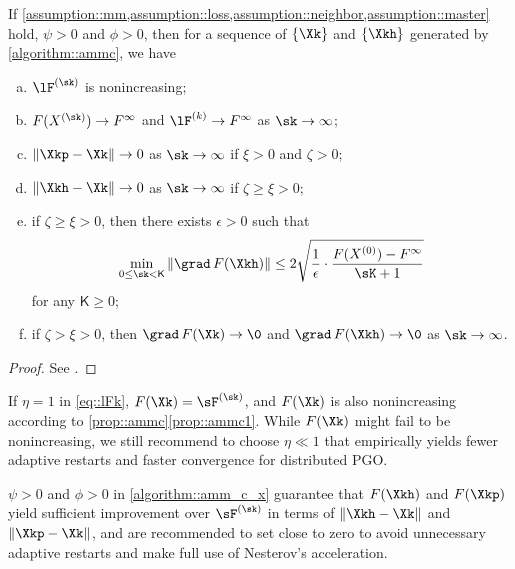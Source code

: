 \begin{prop}
{\highlight If \cref{assumption::mm,assumption::loss,assumption::neighbor,assumption::master} hold, $\psi>0$ and $\phi>0$,}  then for a sequence of $\{\Xk\}$ and $\{\Xkh\}$ generated by \cref{algorithm::ammc}, we have
\begin{enumerate}[(a)]
	\item\label{prop::ammc1}  $\lF^{(\sk)}$  is nonincreasing;
	\item\label{prop::ammc2}  $F(X^{(\sk)})\rightarrow F^\infty$ and $\lF^{(k)}\rightarrow F^\infty$  as $\sk\rightarrow\infty$;
	\item\label{prop::ammc3} $\|\Xkp-\Xk\|\rightarrow 0$ as $\sk\rightarrow\infty$ if $\xi>0$ and $\zeta>0$;
	\item\label{prop::ammc4} $\|\Xkh-\Xk\|\rightarrow 0$ as $\sk\rightarrow\infty$ if $\zeta\geq\xi>0$;
	\item\label{prop::ammc5} if $\zeta \geq\xi>0$, then there exists $\epsilon > 0$ such that 
	\begin{equation}
		\nonumber
		\min\limits_{0\leq\sk< \mathsf{K}}\|\grad\, F(\Xkh)\|\leq 2\sqrt{\frac{1}{\epsilon}\cdot\dfrac{F(X^{(0)})-F^\infty}{{\sK+1}}}
	\end{equation}
	for any $\mathsf{K}\geq 0$;
	\item\label{prop::ammc6} if $\zeta > \xi> 0$, then 
	$\grad\, F(\Xk)\rightarrow \0$ and
	$\grad\, F(\Xkh)\rightarrow \0$ as $\sk\rightarrow \infty$.
\end{enumerate}
\label{prop::ammc}
\end{prop}
\begin{proof}
	See .
\end{proof}


\begin{remark}
If $\eta=1$  in \cref{eq::lFk}, $F(\Xk)=\sF^{(\sk)}$, and $F(\Xk)$ is also nonincreasing according to \cref{prop::ammc}\ref{prop::ammc1}. While $F(\Xk)$  might fail to be nonincreasing, we still recommend to choose $\eta\ll 1$  that empirically yields fewer adaptive restarts and faster convergence for distributed PGO.
\end{remark}

\begin{remark}
$\psi>0$ and $\phi>0$ in  \cref{algorithm::amm_c_x} guarantee that $F(\Xkh)$ and $F(\Xkp)$ yield sufficient improvement over $\sF^{(\sk)}$ in terms of $\|\Xkh-\Xk\|$ and $\|\Xkp-\Xk\|$, and are recommended to set close to zero to avoid unnecessary adaptive restarts and make full use of Nesterov's  acceleration.
\end{remark}



